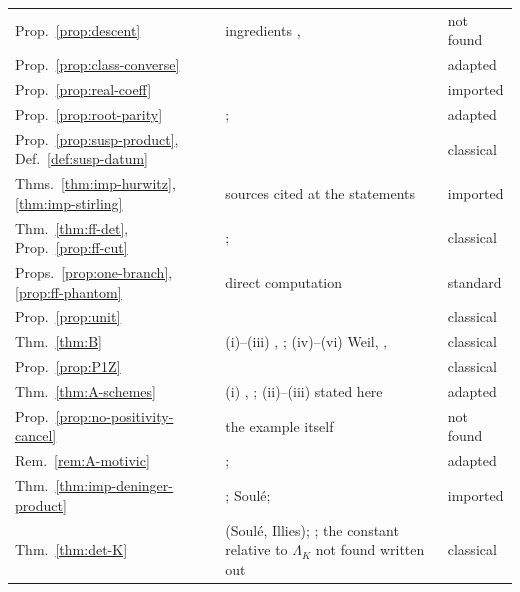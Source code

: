 \documentclass[11pt]{amsart}
\theoremstyle{plain}
\theoremstyle{definition}
\theoremstyle{remark}
\numberwithin{equation}{section}
\begin{document}
{\begin{longtable}{@{}>{\raggedright\arraybackslash}p{}
>{\raggedright\arraybackslash}p{}
>{\raggedright\arraybackslash}p{}@{}}
Prop.~\ref{prop:descent} & ingredients
\cite[\S13.1, p.~104]{Serre1977LinearReps},
\cite[2.10--2.12]{Deninger2022NoWeil} & not found\\
Prop.~\ref{prop:class-converse} &
\cite[Theorem~2.15]{Deninger2025BSDDedekind} & adapted\\
Prop.~\ref{prop:real-coeff} & \cite[Theorem~2.13]{Deninger2022NoWeil}
& imported\\
Prop.~\ref{prop:root-parity} & \cite[2.7--2.8]{Deninger2022NoWeil};
\cite[Proposition~3.1]{Deninger2025BSDDedekind} & adapted\\
Prop.~\ref{prop:susp-product}, Def.~\ref{def:susp-datum} &
\cite[\S4, pp.~16--17]{Deninger1994Motivic} & classical\\
Thms.~\ref{thm:imp-hurwitz}, \ref{thm:imp-stirling} & sources cited
at the statements & imported\\
Thm.~\ref{thm:ff-det}, Prop.~\ref{prop:ff-cut} &
\cite[(2.7)--(2.10), (4.1)]{Deninger1994Motivic};
\cite[Proposition~7.1]{Hesselholt2016THHZeta} & classical\\
Props.~\ref{prop:one-branch}, \ref{prop:ff-phantom} & direct
computation & standard\\
Prop.~\ref{prop:unit} & \cite[pp.~167--168, Proposition~3.1]%
{Deninger1998Analogies} & classical\\
Thm.~\ref{thm:B} & (i)--(iii) \cite[\S4, (4.1)]{Deninger1994Motivic},
\cite[Theorem~3.3, p.~172]{Deninger1998Analogies}; (iv)--(vi) Weil,
\cite[Lemma~4.6]{Kleiman1968Cycles}, \cite[\S3]{Milne2016RHFF} &
classical\\
Prop.~\ref{prop:P1Z} & \cite[Conjecture~1(c), p.~2]%
{Deninger2010HilbertPolya} & classical\\
Thm.~\ref{thm:A-schemes} & (i) \cite[p.~172]{Deninger1998Analogies},
\cite[p.~5]{Deninger2010HilbertPolya}; (ii)--(iii) stated here &
adapted\\
Prop.~\ref{prop:no-positivity-cancel} & the example itself & not
found\\
Rem.~\ref{rem:A-motivic} & \cite[pp.~6--7]{Deninger2010HilbertPolya};
\cite[(7.11)--(7.13)]{Deninger1994Motivic} & adapted\\
Thm.~\ref{thm:imp-deninger-product} &
\cite[Theorem~3.3 and Remark~3.4(1)]{Deninger1992Local};
Soul\'e; \cite[p.~24]{Kurokawa1988Parabolic} & imported\\
Thm.~\ref{thm:det-K} & \cite[Theorem~7.18(ii)]{Deninger1994Motivic}
(Soul\'e, Illies); \cite[p.~24]{Kurokawa1988Parabolic}; the constant
relative to $\Lambda_K$ not found written out & classical\\

\end{longtable}}
\end{document}

